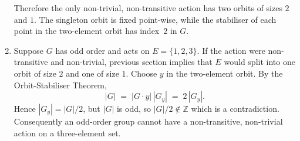 \documentclass[12pt]{article}
\begin{document}
\begin{enumerate}[label=(\arabic*)]
Therefore the only non-trivial, non-transitive action has two orbits
of sizes \(2\) and \(1\). The singleton orbit is fixed point-wise, while
the stabiliser of each point in the two-element orbit has index~\(2\) in
\(G\).

\item
Suppose \(G\) has odd order and acts on \(E=\{1,2,3\}\).
If the action were non-transitive and non-trivial, previous section implies that \(E\) would split into
one orbit of size \(2\) and one of size \(1\).
Choose \(y\) in the two-element orbit.
By the Orbit-Stabiliser Theorem,
\[
|G| \;=\; |G\!\cdot\!y|\,|G_{y}| \;=\; 2\,|G_{y}|.
\]
Hence \(|G_{y}| = |G|/2\), but \(|G|\) is odd, so \(|G|/2\notin\mathbb Z\) which is a contradiction. Consequently an odd-order group cannot have a non-transitive, non-trivial action on a three-element set.
\end{enumerate}
\end{document}
